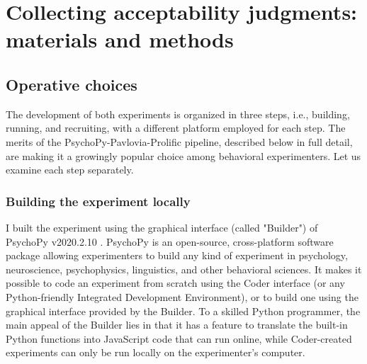 \setchapterpreamble[u]{\margintoc}
\chapter{Collecting acceptability judgments: materials and methods}



\section{Operative choices} 
The development of both experiments is organized in three steps, i.e., building, running, and recruiting, with a different platform employed for each step. The merits of the PsychoPy-Pavlovia-Prolific pipeline, described below in full detail, are making it a growingly popular choice among behavioral experimenters. Let us examine each step separately.

\subsection{Building the experiment locally} 
I built the experiment using the graphical interface (called "Builder") of PsychoPy v2020.2.10 \parencite{peirce2019psychopy2}. PsychoPy is an open-source, cross-platform software package allowing experimenters to build any kind of experiment in psychology, neuroscience, psychophysics, linguistics, and other behavioral sciences. It makes it possible to code an experiment from scratch using the Coder interface (or any Python-friendly Integrated Development Environment), or to build one using the graphical interface provided by the Builder. To a skilled Python programmer, the main appeal of the Builder lies in that it has a feature to translate the built-in Python functions into JavaScript code that can run online, while Coder-created experiments can only be run locally on the experimenter's computer.

